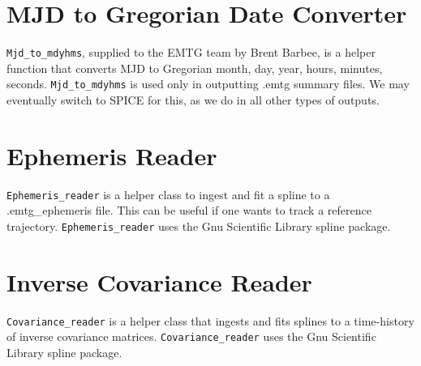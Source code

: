 \section{MJD to Gregorian Date Converter}
\label{sec:MJD_to_Gregorian_date_converter}

\texttt{Mjd\_to\_mdyhms}, supplied to the \ac{EMTG} team by Brent Barbee, is a helper function that converts \ac{MJD} to Gregorian month, day, year, hours, minutes, seconds. \texttt{Mjd\_to\_mdyhms} is used only in outputting .emtg summary files. We may eventually switch to SPICE for this, as we do in all other types of outputs.

\section{Ephemeris Reader}
\label{sec:ephemeris_reader}

\texttt{Ephemeris\_reader} is a helper class to ingest and fit a spline to a .emtg\_ephemeris file. This can be useful if one wants to track a reference trajectory. \texttt{Ephemeris\_reader} uses the Gnu Scientific Library spline package.

\section{Inverse Covariance Reader}
\label{sec:inverse_covariance_reader}

\texttt{Covariance\_reader} is a helper class that ingests and fits splines to a time-history of inverse covariance matrices. \texttt{Covariance\_reader} uses the Gnu Scientific Library spline package.